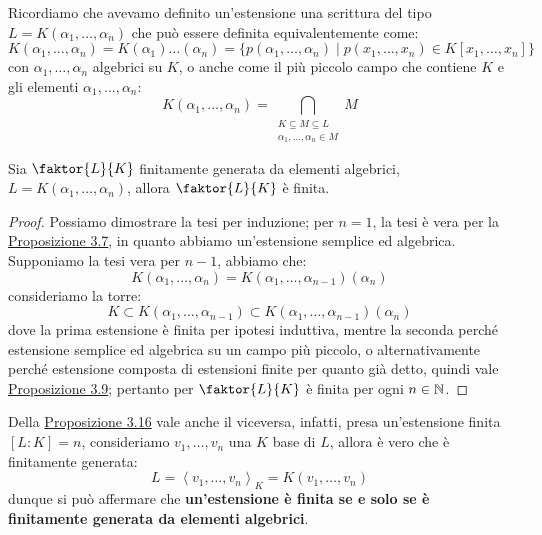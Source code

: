 \documentclass[11pt]{scrartcl}
\begin{document}
\begin{remark}
    Ricordiamo che avevamo definito un'estensione  una scrittura del tipo $L = K(\alpha_1,\ldots,\alpha_n)$ che può essere definita equivalentemente come:
    \[ K(\alpha_1,\ldots,\alpha_n) = K(\alpha_1)\ldots(\alpha_n) = \{p(\alpha_1,\ldots,\alpha_n) \mid p(x_1,\ldots,x_n) \in K[x_1,\ldots,x_n] \}
        \]
    con $\alpha_1,\ldots,\alpha_n$ algebrici su $K$, o anche come il più piccolo campo che contiene $K$ e gli elementi $\alpha_1,\ldots,\alpha_n$:
    \[ K(\alpha_1,\ldots,\alpha_n) = \bigcap_{\substack{K \subseteq M \subseteq L \\ \alpha_1,\ldots,\alpha_n \in M}}M
        \]
\end{remark}

\begin{proposition}
    \label{3.16}
    Sia $\faktor{L}{K}$ finitamente generata da elementi algebrici, $L = K(\alpha_1,\ldots,\alpha_n)$, allora $\faktor{L}{K}$ è finita.
\end{proposition}

\begin{proof}
    Possiamo dimostrare la tesi per induzione; per $n = 1$, la tesi è vera per la \hyperref[3.7]{Proposizione 3.7}, in quanto abbiamo un'estensione semplice ed algebrica. Supponiamo la tesi vera per $n-1$, abbiamo che:
    \[ K(\alpha_1,\ldots,\alpha_n) = K(\alpha_1,\ldots,\alpha_{n-1})(\alpha_n)
        \]
    consideriamo la torre:
    \[ K \subset K(\alpha_1,\ldots,\alpha_{n-1}) \subset K(\alpha_1,\ldots,\alpha_{n-1})(\alpha_n)
        \]
    dove la prima estensione è finita per ipotesi induttiva, mentre la seconda perché estensione semplice ed algebrica su un campo più piccolo, o alternativamente perché estensione composta di estensioni finite per quanto già detto, 
    quindi vale \hyperref[3.9]{Proposizione 3.9}; pertanto per $\faktor{L}{K}$ è finita per ogni $n \in \mathbb N$.
\end{proof}

\pagebreak
\begin{remark}
    Della \hyperref[3.16]{Proposizione 3.16} vale anche il viceversa, infatti, presa un'estensione finita $[L:K] = n$, consideriamo $v_1,\ldots,v_n$ una $K$ base di $L$, allora 
    è vero che è finitamente generata:
    \[ L = \left<v_1,\ldots,v_n\right>_K = K(v_1,\ldots,v_n)
        \]
    dunque si può affermare che \textbf{un'estensione è finita se e solo se è finitamente generata da elementi algebrici}.
\end{remark}
\end{document}
